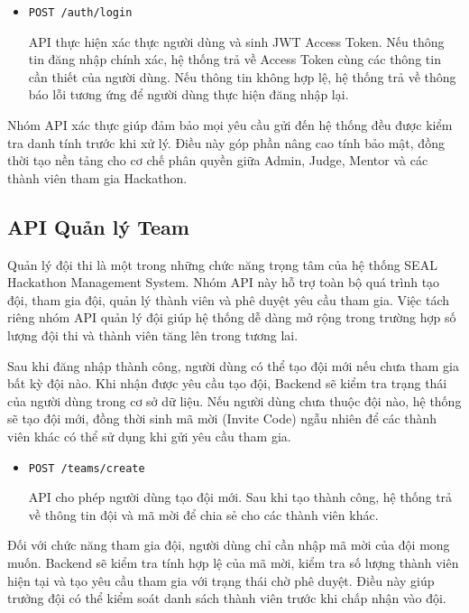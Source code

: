 \begin{itemize}
	\item \texttt{POST /auth/login}
	
	API thực hiện xác thực người dùng và sinh JWT Access Token. Nếu thông tin đăng nhập chính xác, hệ thống trả về Access Token cùng các thông tin cần thiết của người dùng. Nếu thông tin không hợp lệ, hệ thống trả về thông báo lỗi tương ứng để người dùng thực hiện đăng nhập lại.
\end{itemize}

Nhóm API xác thực giúp đảm bảo mọi yêu cầu gửi đến hệ thống đều được kiểm tra danh tính trước khi xử lý. Điều này góp phần nâng cao tính bảo mật, đồng thời tạo nền tảng cho cơ chế phân quyền giữa Admin, Judge, Mentor và các thành viên tham gia Hackathon.

\subsection{API Quản lý Team}

Quản lý đội thi là một trong những chức năng trọng tâm của hệ thống SEAL Hackathon Management System. Nhóm API này hỗ trợ toàn bộ quá trình tạo đội, tham gia đội, quản lý thành viên và phê duyệt yêu cầu tham gia. Việc tách riêng nhóm API quản lý đội giúp hệ thống dễ dàng mở rộng trong trường hợp số lượng đội thi và thành viên tăng lên trong tương lai.

Sau khi đăng nhập thành công, người dùng có thể tạo đội mới nếu chưa tham gia bất kỳ đội nào. Khi nhận được yêu cầu tạo đội, Backend sẽ kiểm tra trạng thái của người dùng trong cơ sở dữ liệu. Nếu người dùng chưa thuộc đội nào, hệ thống sẽ tạo đội mới, đồng thời sinh mã mời (Invite Code) ngẫu nhiên để các thành viên khác có thể sử dụng khi gửi yêu cầu tham gia.

\begin{itemize}
	\item \texttt{POST /teams/create}
	
	API cho phép người dùng tạo đội mới. Sau khi tạo thành công, hệ thống trả về thông tin đội và mã mời để chia sẻ cho các thành viên khác.
\end{itemize}

Đối với chức năng tham gia đội, người dùng chỉ cần nhập mã mời của đội mong muốn. Backend sẽ kiểm tra tính hợp lệ của mã mời, kiểm tra số lượng thành viên hiện tại và tạo yêu cầu tham gia với trạng thái chờ phê duyệt. Điều này giúp trưởng đội có thể kiểm soát danh sách thành viên trước khi chấp nhận vào đội.

